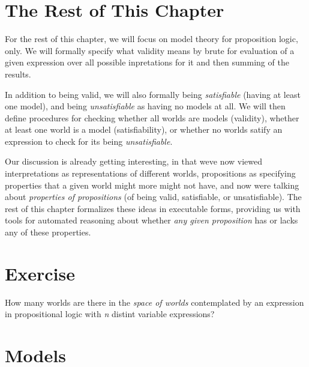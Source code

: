 \documentclass{book}
\begin{document}
\hypertarget{book__pandoc__debug__src__modeltheory.md__the-rest-of-this-chapter}{%
\section*{The Rest of This Chapter}\label{book__pandoc__debug__src__modeltheory.md__the-rest-of-this-chapter}}

For the rest of this chapter, we will focus on model theory for proposition logic, only. We will formally specify what validity means by brute for evaluation of a given expression over all possible inpretations for
it and then summing of the results.

In addition to being valid, we will also formally being \emph{satisfiable} (having at least one model), and being \emph{unsatisfiable} as having no models at all. We will then define procedures for checking whether all worlds are models (validity), whether at least one world is a model (satisfiability), or whether no worlds satify an expression to check for its being \emph{unsatisfiable}.

Our discussion is already getting interesting, in that
we\textquotesingle ve now viewed interpretations as representations of different worlds, propositions as specifying properties that a given world might more might not have, and now we\textquotesingle re talking about \emph{properties of propositions} (of being valid, satisfiable, or unsatisfiable). The rest of this chapter formalizes these ideas in executable forms, providing us with tools for automated reasoning about whether \emph{any given proposition} has or lacks any of these properties.

\hypertarget{book__pandoc__debug__src__modeltheory.md__exercise}{%
\section*{Exercise}\label{book__pandoc__debug__src__modeltheory.md__exercise}}

How many worlds are there in the \emph{space of worlds}
contemplated by an expression in propositional logic
with \emph{n} distint variable expressions?

\hypertarget{book__pandoc__debug__src__dmt1__lectures__l03_modeltheory__models.lean.md}{}
\hypertarget{book__pandoc__debug__src__dmt1__lectures__l03_modeltheory__models.lean.md__models}{%
\section{Models}\label{book__pandoc__debug__src__dmt1__lectures__l03_modeltheory__models.lean.md__models}}
\end{document}
